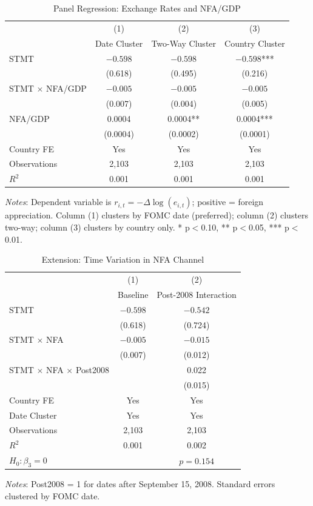 \documentclass[12pt]{article}
\begin{document}
\begin{table}
\centering
\caption{Panel Regression: Exchange Rates and NFA/GDP}
\label{tab:panel}
\begin{tabular}{lccc}
\toprule
 & (1) & (2) & (3) \\
 & Date Cluster & Two-Way Cluster & Country Cluster \\
\midrule
STMT & $-0.598$ & $-0.598$ & $-0.598$*** \\
 & (0.618) & (0.495) & (0.216) \\
STMT $\times$ NFA/GDP & $-0.005$ & $-0.005$ & $-0.005$ \\
 & (0.007) & (0.004) & (0.005) \\
NFA/GDP & 0.0004 & 0.0004** & 0.0004*** \\
 & (0.0004) & (0.0002) & (0.0001) \\
\midrule
Country FE & Yes & Yes & Yes \\
Observations & 2,103 & 2,103 & 2,103 \\
$R^2$ & 0.001 & 0.001 & 0.001 \\
\bottomrule
\end{tabular}
\begin{flushleft}
\footnotesize \textit{Notes}: Dependent variable is $r_{i,t} = -\Delta\log(e_{i,t})$; positive = foreign appreciation. Column (1) clusters by FOMC date (preferred); column (2) clusters two-way; column (3) clusters by country only. * p$<$0.10, ** p$<$0.05, *** p$<$0.01.
\end{flushleft}
\end{table}

\begin{table}
\centering
\caption{Extension: Time Variation in NFA Channel}
\label{tab:extension}
\begin{tabular}{lcc}
\toprule
 & (1) & (2) \\
 & Baseline & Post-2008 Interaction \\
\midrule
STMT & $-0.598$ & $-0.542$ \\
 & (0.618) & (0.724) \\
STMT $\times$ NFA & $-0.005$ & $-0.015$ \\
 & (0.007) & (0.012) \\
STMT $\times$ NFA $\times$ Post2008 & & 0.022 \\
 & & (0.015) \\
\midrule
Country FE & Yes & Yes \\
Date Cluster & Yes & Yes \\
Observations & 2,103 & 2,103 \\
$R^2$ & 0.001 & 0.002 \\
\midrule
$H_0: \beta_3 = 0$ & & $p = 0.154$ \\
\bottomrule
\end{tabular}
\begin{flushleft}
\footnotesize \textit{Notes}: Post2008 = 1 for dates after September 15, 2008. Standard errors clustered by FOMC date.
\end{flushleft}
\end{table}
\end{document}
